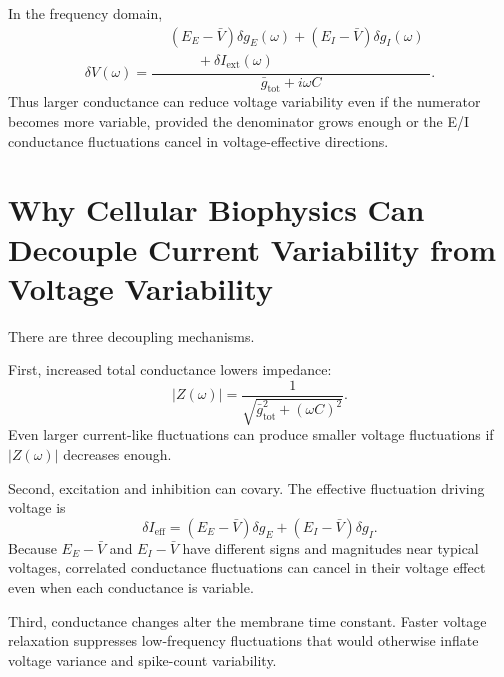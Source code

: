In the frequency domain,
%
\begin{equation}
  \delta V(\omega)
  =
  \frac{\begin{aligned}
      &(E_E-\bar V)\delta g_E(\omega)
      +(E_I-\bar V)\delta g_I(\omega)\\
      &\qquad+\delta I_{\mathrm{ext}}(\omega)
    \end{aligned}
  }{\bar g_{\mathrm{tot}}+i\omega C}.
  \label{eq:conductance-impedance}
\end{equation}
%
Thus larger conductance can reduce voltage variability even if the numerator becomes more variable, provided the denominator grows enough or the E/I conductance fluctuations cancel in voltage-effective directions.

\section{Why Cellular Biophysics Can Decouple Current Variability from Voltage Variability}
\label{sec:biophysics-decouples-current-voltage-variability}

There are three decoupling mechanisms.

First, increased total conductance lowers impedance:
%
\begin{equation}
  |Z(\omega)|
  =
  \frac{1}{\sqrt{\bar g_{\mathrm{tot}}^2+(\omega C)^2}}.
  \label{eq:conductance-impedance-magnitude}
\end{equation}
%
Even larger current-like fluctuations can produce smaller voltage fluctuations if $|Z(\omega)|$ decreases enough.

Second, excitation and inhibition can covary. The effective fluctuation driving voltage is
%
\begin{equation}
  \delta I_{\mathrm{eff}}
  =
  (E_E-\bar V)\delta g_E
  +
  (E_I-\bar V)\delta g_I.
  \label{eq:effective-conductance-current}
\end{equation}
%
Because $E_E-\bar V$ and $E_I-\bar V$ have different signs and magnitudes near typical voltages, correlated conductance fluctuations can cancel in their voltage effect even when each conductance is variable.

Third, conductance changes alter the membrane time constant. Faster voltage relaxation suppresses low-frequency fluctuations that would otherwise inflate voltage variance and spike-count variability.


